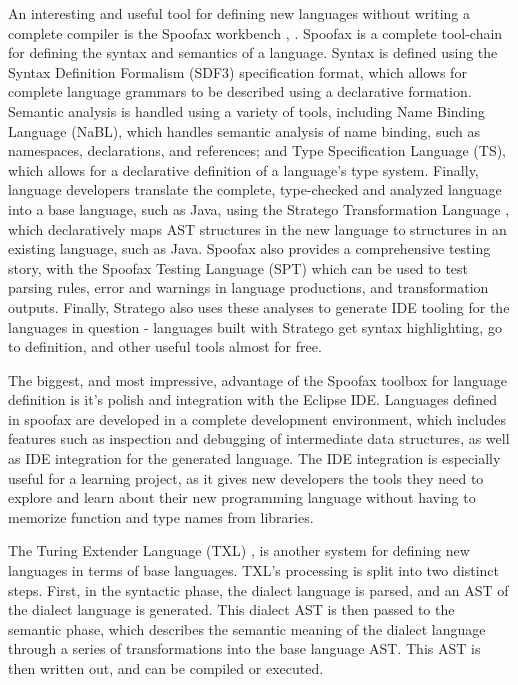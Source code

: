 An interesting and useful tool for defining new languages without writing a
complete compiler is the Spoofax
workbench \cite{spoofaxpaper}, \cite{spoofaxweb}. Spoofax is a complete
tool-chain for defining the syntax and semantics of a language. Syntax is
defined using the Syntax Definition Formalism (SDF3) specification format, which
allows for complete language grammars to be described using a declarative
formation. Semantic analysis is handled using a variety of tools, including Name
Binding Language (NaBL), which handles semantic analysis of name binding, such
as namespaces, declarations, and references; and Type Specification Language
(TS), which allows for a declarative definition of a language's type system.
Finally, language developers translate the complete, type-checked and analyzed
language into a base language, such as Java, using the Stratego Transformation
Language \cite{strategoweb}, which declaratively maps AST structures in the new
language to structures in an existing language, such as Java. Spoofax also
provides a comprehensive testing story, with the Spoofax Testing Language (SPT)
which can be used to test parsing rules, error and warnings in language
productions, and transformation outputs. Finally, Stratego also uses these
analyses to generate IDE tooling for the languages in question - languages built
with Stratego get syntax highlighting, go to definition, and other useful tools
almost for free.

The biggest, and most impressive, advantage of the Spoofax toolbox for language
definition is it’s polish and integration with the Eclipse IDE. Languages
defined in spoofax are developed in a complete development environment, which
includes features such as inspection and debugging of intermediate data
structures, as well as IDE integration for the generated language. The IDE
integration is especially useful for a learning project, as it gives new
developers the tools they need to explore and learn about their new programming
language without having to memorize function and type names from libraries.

The Turing Extender Language (TXL) \cite{txlpaper}, \cite{txlweb} is another
system for defining new languages in terms of base languages. TXL’s processing
is split into two distinct steps. First, in the syntactic phase, the dialect
language is parsed, and an AST of the dialect language is generated. This
dialect AST is then passed to the semantic phase, which describes the semantic
meaning of the dialect language through a series of transformations into the
base language AST. This AST is then written out, and can be compiled or
executed.

